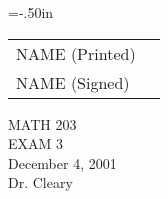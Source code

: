 \pagestyle{headings}
\textwidth=6.25in
\textheight=9in
\hoffset=-.50in
\parindent=0in

%
\begin{titlepage}
\newcommand{\ul}{\underline}
\newcommand{\spa}{\hspace{.15in}}
%
%
{\Large
\begin{tabular}{ll}
NAME (Printed) & \ul{\hspace{3in}}  \vspace{.45in} \\
NAME (Signed) & \ul{\hspace{3in}} \vspace{.25in} \\
\end{tabular} 
}
{\Large
\begin{center}
MATH 203 \\ EXAM 3 \\ December 4, 2001\\ Dr. Cleary
\bigskip
\medskip


\end{center}}
\end{titlepage}
